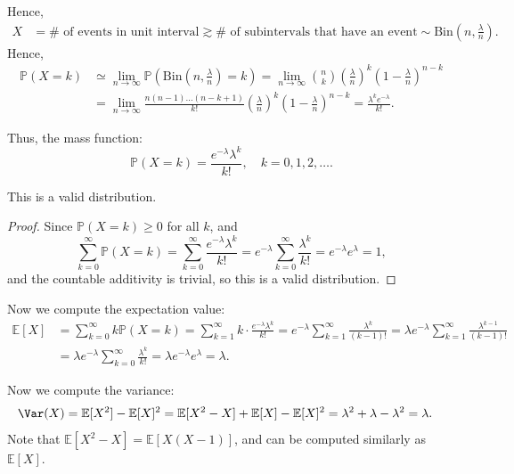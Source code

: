Hence,
\begin{align*}
    X &= \# \text{ of events in unit interval} \gtrsim \# \text{ of subintervals that have an event} \sim \mathrm{Bin}(n, \frac{\lambda}{n}).   
\end{align*}
Hence,
\begin{align*}
    \mathbb{P} (X = k) &\simeq \lim_{n \to \infty} \mathbb{P} \left( \mathrm{Bin}(n, \frac{\lambda}{n}) = k  \right) = \lim_{n \to \infty} \binom{n}{k} \left( \frac{\lambda}{n} \right)^k \left( 1 - \frac{\lambda}{n} \right)^{n-k} \\
    &= \lim_{n \to \infty} \frac{n(n-1)\dots (n-k+1)}{k!} \left( \frac{\lambda}{n} \right)^k \left( 1 - \frac{\lambda}{n} \right)^{n-k} = \frac{\lambda ^k e^{-\lambda }}{k!}.      
\end{align*}

Thus, the mass function:
\[
    \mathbb{P} (X = k) = \frac{e^{-\lambda } \lambda ^k}{k!}, \quad k = 0, 1, 2, \dots .
\]
\begin{claim}
    This is a valid distribution.
\end{claim}
\begin{proof}
    Since \(\mathbb{P} (X = k) \ge 0\) for all \(k\), and 
    \[
        \sum_{k=0}^{\infty } \mathbb{P} (X = k) = \sum_{k=0}^{\infty} \frac{e^{-\lambda } \lambda ^k}{k!} = e^{-\lambda } \sum_{k=0}^{\infty} \frac{\lambda ^k}{k!} = e^{-\lambda } e^{\lambda } = 1,   
    \] 
    and the countable additivity is trivial, so this is a valid distribution.
\end{proof}

Now we compute the expectation value:
\begin{align*}
    \mathbb{E} [X] &= \sum_{k=0}^{\infty} k \mathbb{P} (X = k) = \sum_{k=1}^{\infty} k \cdot \frac{e^{-\lambda } \lambda ^k}{k!} = e^{-\lambda } \sum_{k=1}^{\infty} \frac{\lambda ^k}{(k-1)!} = \lambda e^{-\lambda } \sum_{k=1}^{\infty } \frac{\lambda ^{k-1}}{(k-1)!} \\
    &= \lambda e^{-\lambda } \sum_{k=0}^{\infty} \frac{\lambda ^k}{k!} = \lambda e^{-\lambda } e^{\lambda } = \lambda .      
\end{align*}

Now we compute the variance:
\begin{align*}
    \Var(X) &= \mathbb{E} [X^2] - \mathbb{E} [X]^2 = \mathbb{E} [X^2 - X] + \mathbb{E} [X] - \mathbb{E} [X]^2 = \lambda ^2 + \lambda - \lambda ^2 = \lambda . 
\end{align*}
Note that \(\mathbb{E} [X^2 - X] = \mathbb{E} [X(X - 1)]\), and can be computed similarly as \(\mathbb{E} [X]\). 

